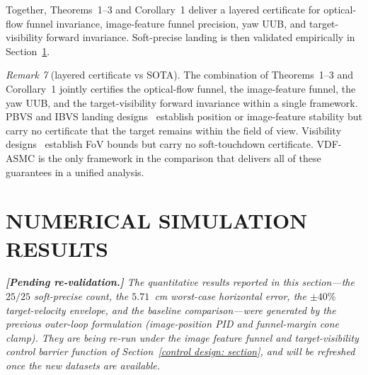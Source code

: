 \documentclass{IEEEtaes}
\begin{document}
Together, Theorems~1--3 and Corollary~1 deliver a layered certificate for optical-flow funnel invariance, image-feature funnel precision, yaw UUB, and target-visibility forward invariance. Soft-precise landing is then validated empirically in Section~\ref{experimentation: section}.

\textit{Remark 7} (layered certificate vs SOTA). The combination of Theorems~1--3 and Corollary~1 jointly certifies the optical-flow funnel, the image-feature funnel, the yaw UUB, and the target-visibility forward invariance within a single framework. PBVS and IBVS landing designs~\cite{lin2022, zhang2026, cho2022, lin2023} establish position or image-feature stability but carry no certificate that the target remains within the field of view. Visibility designs~\cite{salehi2021, xie2016} establish FoV bounds but carry no soft-touchdown certificate. VDF-ASMC is the only framework in the comparison that delivers all of these guarantees in a unified analysis.


\section{NUMERICAL SIMULATION RESULTS}
\label{experimentation: section}
\textit{\textbf{[Pending re-validation.]} The quantitative results reported in this section---the $25/25$ soft-precise count, the $5.71$~cm worst-case horizontal error, the $\pm 40\%$ target-velocity envelope, and the baseline comparison---were generated by the previous outer-loop formulation (image-position PID and funnel-margin cone clamp). They are being re-run under the image feature funnel and target-visibility control barrier function of Section~\ref{control design: section}, and will be refreshed once the new datasets are available.}
\end{document}
